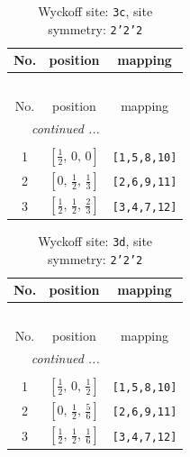 \documentclass[fleqn,8pt]{jsarticle}
\begin{document}
\renewcommand{\arraystretch}{1.2}
\begin{longtable}{ccc}
\caption{Wyckoff site: {\tt 3c}, site symmetry: {\tt 2'2'2}}
 \\
 \hline \hline
No. & position & mapping \\ \hline \endfirsthead

\multicolumn{2}{l}{\tablename\ \thetable{}} \\
 \hline \hline
No. & position & mapping \\ \hline \endhead

 \hline \hline
\multicolumn{2}{r}{\footnotesize\it continued ...} \\ \endfoot

 \hline \hline
\multicolumn{2}{r}{} \\ \endlastfoot

1 & $\left[ \frac{1}{2},\, 0,\, 0 \right]$ & {\tt [1,5,8,10]} \\ \hline
2 & $\left[ 0,\, \frac{1}{2},\, \frac{1}{3} \right]$ & {\tt [2,6,9,11]} \\ \hline
3 & $\left[ \frac{1}{2},\, \frac{1}{2},\, \frac{2}{3} \right]$ & {\tt [3,4,7,12]} \\
\end{longtable}
\renewcommand{\arraystretch}{1.2}
\begin{longtable}{ccc}
\caption{Wyckoff site: {\tt 3d}, site symmetry: {\tt 2'2'2}}
 \\
 \hline \hline
No. & position & mapping \\ \hline \endfirsthead

\multicolumn{2}{l}{\tablename\ \thetable{}} \\
 \hline \hline
No. & position & mapping \\ \hline \endhead

 \hline \hline
\multicolumn{2}{r}{\footnotesize\it continued ...} \\ \endfoot

 \hline \hline
\multicolumn{2}{r}{} \\ \endlastfoot

1 & $\left[ \frac{1}{2},\, 0,\, \frac{1}{2} \right]$ & {\tt [1,5,8,10]} \\ \hline
2 & $\left[ 0,\, \frac{1}{2},\, \frac{5}{6} \right]$ & {\tt [2,6,9,11]} \\ \hline
3 & $\left[ \frac{1}{2},\, \frac{1}{2},\, \frac{1}{6} \right]$ & {\tt [3,4,7,12]} \\
\end{longtable}
\renewcommand{\arraystretch}{1.2}
\end{document}
